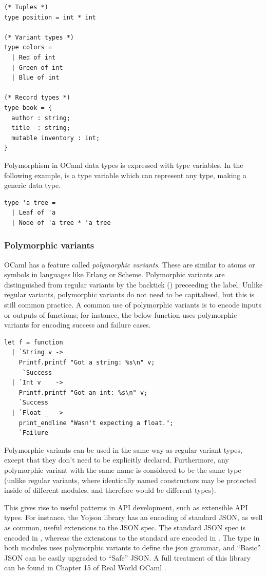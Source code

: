 \begin{lstlisting}
(* Tuples *)
type position = int * int

(* Variant types *)
type colors =
  | Red of int
  | Green of int
  | Blue of int

(* Record types *)
type book = {
  author : string;
  title  : string;
  mutable inventory : int;
}
\end{lstlisting}


Polymorphism in OCaml data types is expressed with type variables. In
the following example,  is a type variable which can
represent any type, making  a generic data type.

\begin{lstlisting}
type 'a tree =
  | Leaf of 'a
  | Node of 'a tree * 'a tree
\end{lstlisting}

\subsubsection{Polymorphic variants}

OCaml has a feature called \emph{polymorphic variants}. These are
similar to atoms or symbols in languages like Erlang or
Scheme. Polymorphic variants are distinguished from regular variants
by the backtick () preceeding the label. Unlike regular
variants, polymorphic variants do not need to be capitalised, but this
is still common practice. A common use of polymorphic variants is to
encode inputs or outputs of functions; for instance, the below
function uses polymorphic variants for encoding success and failure
cases.

\begin{lstlisting}
let f = function
  | `String v ->
    Printf.printf "Got a string: %s\n" v;
     `Success
  | `Int v    ->
    Printf.printf "Got an int: %s\n" v;
    `Success
  | `Float _  ->
    print_endline "Wasn't expecting a float.";
    `Failure
\end{lstlisting}

Polymorphic variants can be used in the same way as regular variant
types, except that they don't need to be explicitly
declared. Furthermore, any polymorphic variant with the same name is
considered to be the same type (unlike regular variants, where
identically named constructors may be protected inside of different
modules, and therefore would be different types).

This gives rise to useful patterns in API development, such as
extensible API types. For instance, the Yojson library has an encoding
of standard JSON, as well as common, useful extensions to the JSON
spec. The standard JSON spec is encoded in ,
whereas the extensions to the standard are encoded in
. The  type in both modules uses
polymorphic variants to define the json grammar, and ``Basic'' JSON
can be easily upgraded to ``Safe'' JSON. A full treatment of this
library can be found in Chapter 15 of Real World OCaml \cite{rwo}.

